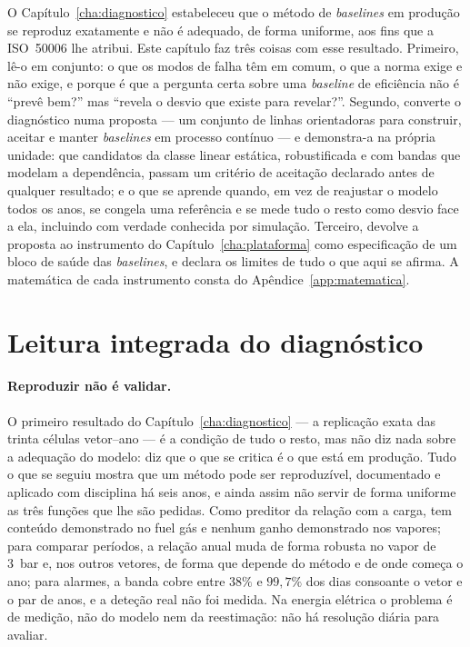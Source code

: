 O Capítulo~\ref{cha:diagnostico} estabeleceu que o método de \emph{baselines}
em produção se reproduz exatamente e não é adequado, de forma uniforme, aos
fins que a ISO~50006 lhe atribui. Este capítulo faz três coisas com esse
resultado. Primeiro, lê-o em conjunto: o que os modos de falha têm em
comum, o que a norma exige e não exige, e porque é que a pergunta certa
sobre uma \emph{baseline} de eficiência não é ``prevê bem?'' mas ``revela o
desvio que existe para revelar?''. Segundo, converte o diagnóstico numa
proposta --- um conjunto de linhas orientadoras para construir, aceitar e
manter \emph{baselines} em processo contínuo --- e demonstra-a na própria
unidade: que candidatos da classe linear estática, robustificada e com
bandas que modelam a dependência, passam um critério de aceitação declarado antes de
qualquer resultado; e o que se aprende quando, em vez de reajustar o modelo
todos os anos, se congela uma referência e se mede tudo o resto como desvio
face a ela, incluindo com verdade conhecida por simulação. Terceiro,
devolve a proposta ao instrumento do Capítulo~\ref{cha:plataforma} como
especificação de um bloco de saúde das \emph{baselines}, e declara os
limites de tudo o que aqui se afirma. A matemática de cada instrumento
consta do Apêndice~\ref{app:matematica}.

\section{Leitura integrada do diagnóstico}
\label{sec:leitura-integrada}

\paragraph{Reproduzir não é validar.} O primeiro resultado do
Capítulo~\ref{cha:diagnostico} --- a replicação exata das trinta células
vetor--ano --- é a condição de tudo o resto, mas não diz nada sobre a
adequação do modelo: diz que o que se critica é o que está em produção.
Tudo o que se seguiu mostra que um método pode ser reproduzível, documentado
e aplicado com disciplina há seis anos, e ainda assim não servir de forma
uniforme as três funções que lhe são pedidas. Como preditor da relação com a
carga, tem conteúdo demonstrado no fuel gás e nenhum ganho demonstrado nos
vapores; para comparar períodos, a relação anual muda de forma robusta no
vapor de 3~bar e, nos outros vetores, de forma que depende do método e de
onde começa o ano; para alarmes, a banda cobre entre $38\%$ e $99{,}7\%$ dos
dias consoante o vetor e o par de anos, e a deteção real não foi medida. Na
energia elétrica o problema é de medição, não do modelo nem da
reestimação: não há resolução diária para avaliar.

